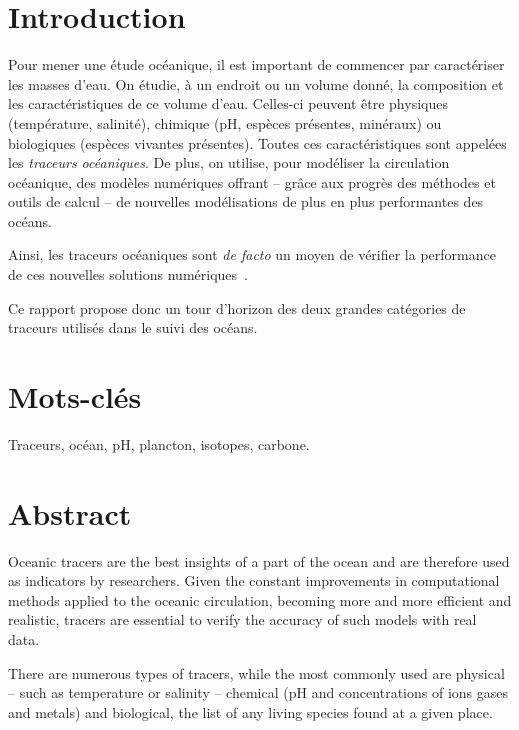 \section*{Introduction}
  Pour mener une étude océanique, il est important de commencer par caractériser les masses d'eau.
  On étudie, à un endroit ou un volume donné, la composition et les caractéristiques de ce volume d'eau.
  Celles-ci peuvent être physiques (température, salinité), chimique (pH, espèces présentes, minéraux) ou biologiques (espèces vivantes présentes).
  Toutes ces caractéristiques sont appelées les \emph{traceurs océaniques}.
  De plus, on utilise, pour modéliser la circulation océanique, des modèles numériques offrant -- grâce aux progrès des méthodes et outils de calcul -- de nouvelles modélisations de plus en plus performantes des océans.

  Ainsi, les traceurs océaniques sont \textit{de facto} un moyen de vérifier la performance de ces nouvelles solutions numériques~\cite{jean-baptiste_circulation_1994}.

  Ce rapport propose donc un tour d'horizon des deux grandes catégories de traceurs utilisés dans le suivi des océans.

\section*{Mots-clés}
  Traceurs, océan, pH, plancton, isotopes, carbone.

\section*{Abstract}
  Oceanic tracers are the best insights of a part of the ocean and are therefore used as indicators by researchers.
  Given the constant improvements in computational methods applied to the oceanic circulation, becoming more and more efficient and realistic, tracers are essential to verify the accuracy of such models with real data.

  There are numerous types of tracers, while the most commonly used are physical -- such as temperature or salinity -- chemical (pH and concentrations of ions gases and metals) and biological, \ie{} the list of any living species found at a given place.

